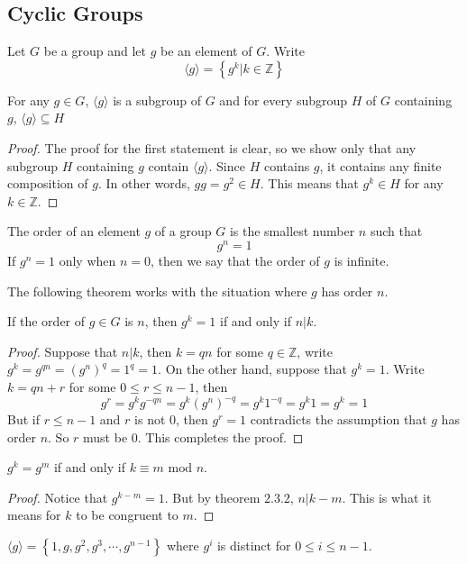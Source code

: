 \documentclass{article}
\begin{document}
\subsection{Cyclic Groups}
Let $G$ be a group and let $g$ be an element of $G$. Write
\[
\langle g\rangle =\left\{ g^k| k\in\mathbb{Z} \right\}
\]
\begin{theorem}
    For any $g\in G$, $\langle g \rangle$ is a subgroup of $G$ and for every subgroup $H$ of $G$ containing $g$,
    $\langle g \rangle \subseteq H$
\end{theorem}
\begin{proof}
    The proof for the first statement is clear, so we show only that any subgroup $H$ containing $g$ contain $\langle g \rangle$.
    Since $H$ contains $g$, it contains any finite composition of $g$. In other words, $gg=g^2\in H$. This means that $g^k\in H$ for any $k\in \mathbb{Z}$.
\end{proof}
\begin{definition}
    The order of an element $g$ of a group $G$ is the smallest number $n$ such that 
    \[
    g^n=1
    \]
    If $g^n=1$ only when $n=0$,  then we say that the order of $g$ is infinite.
\end{definition}
The following theorem works with the situation where $g$ has order $n$.
\begin{theorem}
    
    If the order of $g\in G$ is $n$, then $g^k =1$ if and only if $n|k$.
\end{theorem}
\begin{proof}
    Suppose that $n|k$, then $k=qn$ for some $q\in \mathbb{Z}$, write $g^k=g^{qn}=(g^n)^q=1^q=1$. On the other hand,
    suppose that $g^k=1$. Write $k=qn+r$ for some $0\leq r\leq n-1$, then 
    \[
    g^r =g^kg^{-qn}=g^k(g^n)^{-q}=g^k1^{-q}=g^k1=g^k=1
    \]
    But if $r\leq n-1$ and $r$ is not $0$, then $g^r=1$ contradicts the assumption that $g$ has order $n$. So $r$ must be $0$. This completes the proof.
\end{proof}
\begin{theorem}
    $g^k=g^m$ if and only if $k\equiv m \text{ mod } n$.
\end{theorem}
\begin{proof}
    Notice that $g^{k-m}=1$. But by theorem $2.3.2$, $n|k-m$. This is what it means for $k$ to be congruent to $m$.
\end{proof}
\begin{theorem}
    $\langle g \rangle=\left\{ 1, g, g^2,g^3,\cdots, g^{n-1} \right\}$ where $g^i$ is distinct for $0\leq i\leq n-1$.
\end{theorem}
\end{document}
